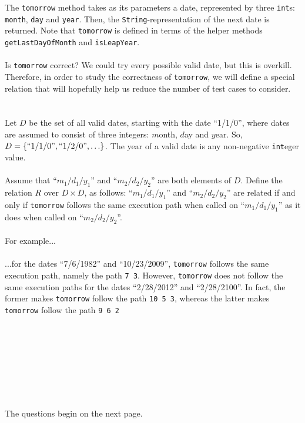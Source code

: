 \documentclass[12pt]{exam}
\begin{document}
\noindent The {\tt tomorrow} method takes as its parameters a date, represented by three {\tt int}s: {\tt month}, {\tt day} and {\tt year}. Then, the {\tt String}-representation of the next date is returned. Note that {\tt tomorrow} is defined in terms of the helper methods {\tt getLastDayOfMonth} and {\tt isLeapYear}. \\
\\
Is {\tt tomorrow} correct? We could try every possible valid date, but this is overkill. Therefore, in order to study the correctness of {\tt tomorrow}, we will define a special relation that will hopefully help us reduce the number of test cases to consider.
\\
\\
\\Let $D$ be the set of all valid dates, starting with the date ``1/1/0'', where dates are assumed to consist of three integers: $m$onth, $d$ay and $y$ear. So, $D = \{ \textmd{``1/1/0''}, \textmd{``1/2/0''}, \ldots \}$. The year of a valid date is any non-negative {\tt int}eger value. \\
\\
Assume that ``$m_1 / d_1 / y_1$'' and ``$m_2 / d_2 / y_2$'' are both elements of $D$. Define the relation $R$ over $D \times D$, as follows: ``$m_1 / d_1 / y_1$'' and ``$m_2 / d_2 / y_2$'' are related if and only if {\tt tomorrow} follows the same execution path when called on ``$m_1 / d_1 / y_1$'' as it does when called on ``$m_2 / d_2 / y_2$''. \\
\\
For example... \\
\\
...for the dates ``7/6/1982'' and ``10/23/2009'', {\tt tomorrow} follows the same execution path, namely the path {\tt 7 3}.  However, {\tt tomorrow} does not follow the same execution paths for the dates ``2/28/2012'' and ``2/28/2100''. In fact, the former makes {\tt tomorrow} follow the path {\tt 10 5 3}, whereas the latter makes {\tt tomorrow} follow the path {\tt 9 6 2} \\
\\
\\
\\
\\
\\
\\
\\
\\
The questions begin on the next page.

\clearpage
\end{document}
